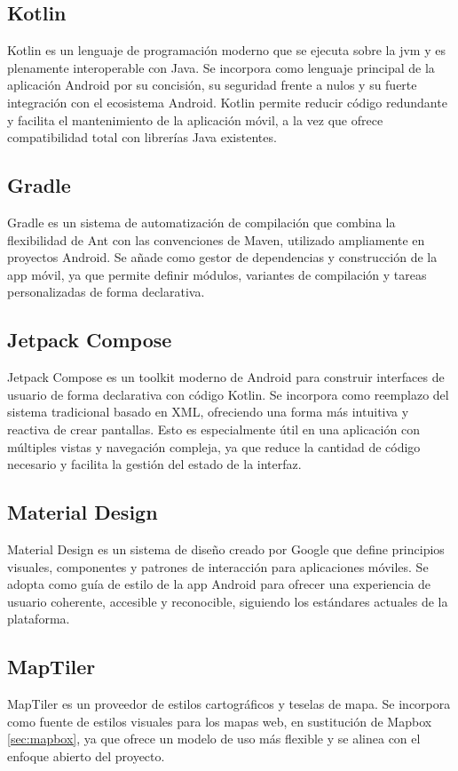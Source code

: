 \subsection{Kotlin}
Kotlin \cite{kotlin} es un lenguaje de programación moderno que se ejecuta sobre la \acrfull{jvm} y es plenamente interoperable con Java. Se incorpora como lenguaje principal de la aplicación Android por su concisión, su seguridad frente a nulos y su fuerte integración con el ecosistema Android. Kotlin permite reducir código redundante y facilita el mantenimiento de la aplicación móvil, a la vez que ofrece compatibilidad total con librerías Java existentes.

\subsection{Gradle}
Gradle \cite{gradle} es un sistema de automatización de compilación que combina la flexibilidad de Ant con las convenciones de Maven, utilizado ampliamente en proyectos Android. Se añade como gestor de dependencias y construcción de la app móvil, ya que permite definir módulos, variantes de compilación y tareas personalizadas de forma declarativa.

\subsection{Jetpack Compose}
Jetpack Compose \cite{jetpack_compose} es un toolkit moderno de Android para construir interfaces de usuario de forma declarativa con código Kotlin. Se incorpora como reemplazo del sistema tradicional basado en XML, ofreciendo una forma más intuitiva y reactiva de crear pantallas. Esto es especialmente útil en una aplicación con múltiples vistas y navegación compleja, ya que reduce la cantidad de código necesario y facilita la gestión del estado de la interfaz.

\subsection{Material Design}
Material Design \cite{material_design} es un sistema de diseño creado por Google que define principios visuales, componentes y patrones de interacción para aplicaciones móviles. Se adopta como guía de estilo de la app Android para ofrecer una experiencia de usuario coherente, accesible y reconocible, siguiendo los estándares actuales de la plataforma.

\subsection{MapTiler}
\label{sec:maptiler}
MapTiler \cite{maptiler} es un proveedor de estilos cartográficos y teselas de mapa. Se incorpora como fuente de estilos visuales para los mapas web, en sustitución de Mapbox \ref{sec:mapbox}, ya que ofrece un modelo de uso más flexible y se alinea con el enfoque abierto del proyecto.

